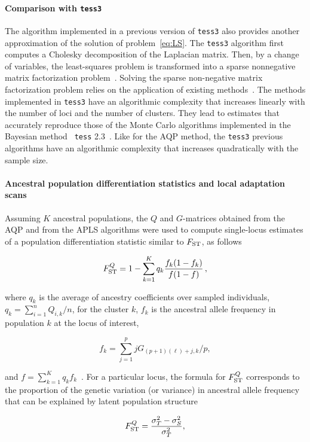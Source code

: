 \paragraph{Comparison with {\tt tess3}} The algorithm implemented in a previous
version of {\tt tess3} also provides another approximation of the solution
of problem~\eqref{eq:LS}. The {\tt tess3} algorithm first computes a Cholesky
decomposition of the Laplacian matrix. Then, by a change of variables, the
least-squares problem is transformed into a sparse nonnegative matrix
factorization problem~\citep{Caye2016}. Solving the sparse non-negative matrix
factorization problem relies on the application of existing
methods~\citep{Kim2011, Frichot2014}. The methods implemented in {\tt tess3}
have an algorithmic complexity that increases linearly with the number of loci
and the number of clusters. They lead to estimates that accurately reproduce
those of the Monte Carlo algorithms implemented in the Bayesian method {\tt
  tess} 2.3~\citep{Caye2016}. Like for the AQP method, the {\tt tess3} previous
algorithms have an algorithmic complexity that increases quadratically with the
sample size.




\paragraph{Ancestral population differentiation statistics and local adaptation
  scans} Assuming $K$ ancestral populations, the $Q$ and $G$-matrices obtained
from the AQP and from the APLS algorithms were used to compute single-locus
estimates of a population differentiation statistic similar to $F_{\rm
  ST}$, as follows

$$
F^{Q}_{\rm ST} = 1 - \sum_{k=1}^K  q_k \frac{f_k (1-f_k)}{f(1-f)} \, ,
$$

\noindent where $q_k$ is the average of ancestry coefficients over sampled
individuals, $q_k = \sum_{i =1}^n Q_{i,k}/n$, for the cluster $k$, $f_k$ is the
ancestral allele frequency in population $k$ at the locus of interest,

$$
f_k =  \sum_{j = 1}^p  j G_{(p+1)(\ell) + j, k}/p ,
$$

and $f = \sum_{k = 1}^K q_k f_k$~\citep{Martins2016}.
For a particular locus, the formula for $F^Q_{\rm ST}$ corresponds to the
proportion of the genetic variation (or variance) in ancestral allele frequency
that can be explained by latent population structure

$$
F^Q _{\rm ST}  =  \frac{\sigma^2_T - \sigma^2_S}{\sigma^2_T },
$$

